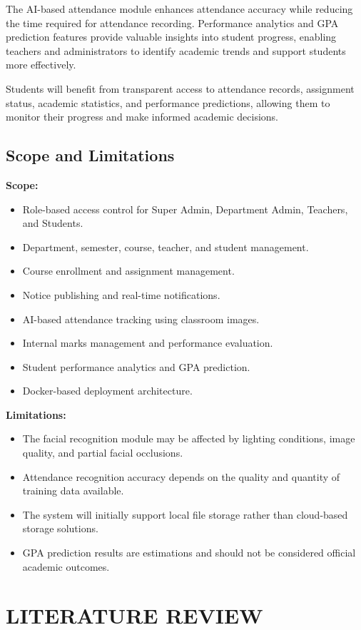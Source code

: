 \documentclass[12pt,a4paper,oneside]{report}
\let\oldsection\section
\renewcommand{\section}{\clearpage\oldsection}
\begin{document}
The AI-based attendance module enhances attendance accuracy while reducing the time required for attendance recording. Performance analytics and GPA prediction features provide valuable insights into student progress, enabling teachers and administrators to identify academic trends and support students more effectively.

Students will benefit from transparent access to attendance records, assignment status, academic statistics, and performance predictions, allowing them to monitor their progress and make informed academic decisions.

\section{Scope and Limitations}
\textbf{Scope:}
\begin{itemize}
\item Role-based access control for Super Admin, Department Admin, Teachers, and Students.
\item Department, semester, course, teacher, and student management.
\item Course enrollment and assignment management.
\item Notice publishing and real-time notifications.
\item AI-based attendance tracking using classroom images.
\item Internal marks management and performance evaluation.
\item Student performance analytics and GPA prediction.
\item Docker-based deployment architecture.
\end{itemize}

\textbf{Limitations:}
\begin{itemize}
\item The facial recognition module may be affected by lighting conditions, image quality, and partial facial occlusions.
\item Attendance recognition accuracy depends on the quality and quantity of training data available.
\item The system will initially support local file storage rather than cloud-based storage solutions.
\item GPA prediction results are estimations and should not be considered official academic outcomes.
\end{itemize}

\chapter{LITERATURE REVIEW}
\end{document}
